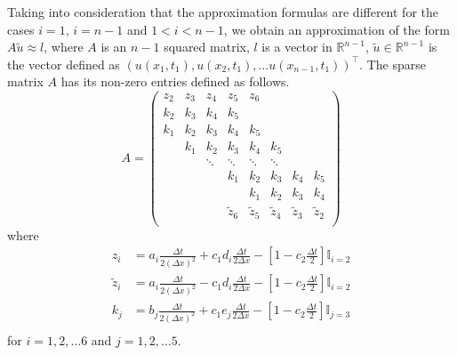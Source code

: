 \documentclass[00main.tex]{subfiles}
\begin{document}
Taking into consideration that the approximation formulas are different for the cases $i=1$, $i=n-1$ and $1<i<n-1$, we obtain an approximation of the form $A \tilde{u} \approx l$, where $A$ is an $n-1$ squared matrix, $l$ is a vector in $\mathbb{R}^{n-1}$, $\tilde{u} \in \mathbb{R}^{n-1}$ is the vector defined as $(u(x_1, t_1), u(x_2,t_1), \hdots u(x_{n-1},t_1))^\top$. The sparse matrix $A$ has its non-zero entries defined as follows. \[ A = \left( \begin{array}{cccccccc}
z_2 & z_3 & z_4 & z_5 & z_6 & & & \\
k_2 & k_3 & k_4 & k_5 & & & & \\
k_1 & k_2 & k_3 & k_4 & k_5 & & & \\
 & k_1 & k_2 & k_3 & k_4 & k_5 & & \\
 & & \ddots & \ddots & \ddots & \ddots & & \\
 & & & k_1 & k_2 & k_3 & k_4 & k_5 \\
 & & & & k_1 & k_2 & k_3 & k_4 \\
 & & & \tilde{z}_6 & \tilde{z}_5 & \tilde{z}_4 & \tilde{z}_3 & \tilde{z}_2 \\
\end{array} \right) \] where \begin{align*} 
z_i &= a_i \frac{\Delta t}{2 (\Delta x)^2} + c_1 d_i \frac{\Delta t}{2 \Delta x} - \left[1 - c_2 \frac{\Delta t}{2} \right] \mathbb{I}_{i=2} \\ 
\tilde{z}_i &= a_i \frac{\Delta t}{2 (\Delta x)^2} - c_1 d_i \frac{\Delta t}{2 \Delta x} -  \left[1 - c_2 \frac{\Delta t}{2} \right] \mathbb{I}_{i=2}\\ 
k_j &= b_j \frac{\Delta t}{2 (\Delta x)^2} + c_1 e_j \frac{\Delta t}{2 \Delta x} -  \left[1 - c_2 \frac{\Delta t}{2} \right] \mathbb{I}_{j=3} \\ 
\end{align*} for $i = 1,2,\hdots 6 $ and $j = 1,2,\hdots 5$.
\end{document}
